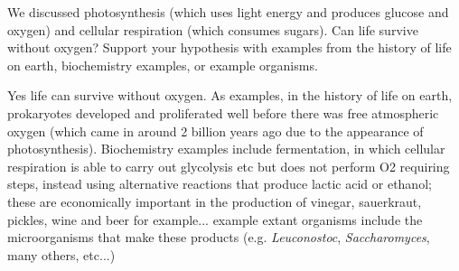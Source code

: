 \documentclass[exam,addpoints,noanswers]{exam}
\begin{document}
\begin{questions}
\clearpage
\question[22] We discussed photosynthesis (which uses light energy and produces glucose and oxygen) and cellular respiration (which consumes sugars).  Can life survive without oxygen? Support your hypothesis with examples from the history of life on earth, biochemistry examples, or example organisms. 
\begin{solution}[6in]
Yes life can survive without oxygen. As examples, in the history of life on earth, prokaryotes developed and proliferated well before there was free atmospheric oxygen (which came in around 2 billion years ago due to the appearance of photosynthesis). Biochemistry examples include fermentation, in which cellular respiration is able to carry out glycolysis etc but does not perform O2 requiring steps, instead using alternative reactions that produce lactic acid or ethanol; these are economically important in the production of vinegar, sauerkraut, pickles, wine and beer for example... example extant organisms include the microorganisms that make these products (e.g. \emph{Leuconostoc}, \emph{Saccharomyces}, many others, etc...) 
\end{solution}

\end{questions}
\end{document}
